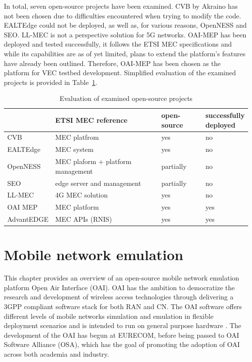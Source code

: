 \documentclass[12pt,a4paper,twoside]{report}
\begin{document}
In total, seven open-source projects have been examined. CVB by Akraino has not been chosen due to difficulties encountered when trying to modify the code. EALTEdge could not be deployed, as well as, for various reasons, OpenNESS and SEO. LL-MEC is not a perspective solution for 5G networks. OAI-MEP has been deployed and tested successfully, it follows the ETSI MEC specifications and while its capabilities are as of yet limited, plans to extend the platform’s features have already been outlined. Therefore, OAI-MEP has been chosen as the platform for VEC testbed development. Simplified evaluation of the examined projects is provided in Table~\ref{T:os-mec-proj}.
\begin{table}[!ht]
    \centering
	\caption{Evaluation of examined open-source projects}
	\label{T:os-mec-proj}
    \begin{tabular}{|l|l|l|l|}
    \hline
        & ETSI MEC reference & open-source & \Longunderstack{successfully\\deployed} \\ \hline
        CVB & MEC platfrom & yes & no \\ \hline
        EALTEdge & MEC system & yes & no \\ \hline
        OpenNESS & MEC plaform + platform management & partially & no \\ \hline
        SEO & edge server and management & partially & no \\ \hline
        LL-MEC & 4G MEC solution & yes & no \\ \hline
        OAI MEP & MEC platform & yes & yes \\ \hline
        AdvantEDGE & MEC APIs (RNIS) & yes & yes \\ \hline
    \end{tabular}
\end{table}
\chapter{Mobile network emulation} %
\label{Ch:OAI}
This chapter provides an overview of an open-source mobile network emulation platform Open Air Interface (OAI). OAI has the ambition to democratize the research and development of wireless access technologies through delivering a 3GPP compliant software stack for both RAN and CN. The OAI software offers different levels of mobile networks simulation and emulation in flexible deployment scenarios and is intended to run on general purpose hardware \cite{kaltenberger-oai}. The development of the OAI has begun at EURECOM, before being passed to OAI Software Alliance (OSA), which has the goal of promoting the adoption of OAI across both academia and industry.
\end{document}
